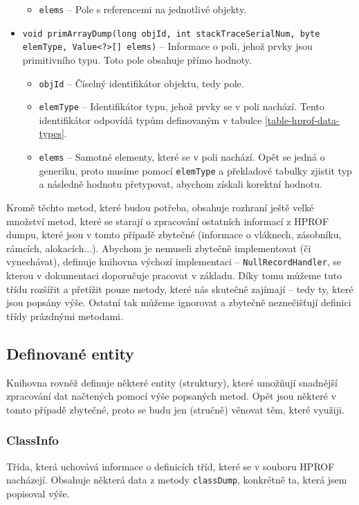 \begin{itemize}
\begin{itemize}
        \item \texttt{elems} -- Pole s referencemi na jednotlivé objekty.
    \end{itemize}
    \item \texttt{void primArrayDump(long objId, int stackTraceSerialNum, byte \\ elemType, Value<?>[] elems)} -- Informace o poli, jehož prvky jsou primitivního typu. Toto pole obsahuje přímo hodnoty.
    \begin{itemize}
        \item \texttt{objId} -- Číselný identifikátor objektu, tedy pole.
        \item \texttt{elemType} -- Identifikátor typu, jehož prvky se v poli nachází. Tento identifikátor odpovídá typům definovaným v tabulce \ref{table-hprof-data-types}.
        \item \texttt{elems} -- Samotné elementy, které se v poli nachází. Opět se jedná o generiku, proto musíme pomocí \texttt{elemType} a překladové tabulky zjistit typ a následně hodnotu přetypovat, abychom získali korektní hodnotu.
    \end{itemize}
\end{itemize}

Kromě těchto metod, které budou potřeba, obsahuje rozhraní ještě velké množství metod, které se starají o zpracování ostatních informací z HPROF dumpu, které jsou v tomto případě zbytečné (informace o vláknech, zásobníku, rámcích, alokacích...). Abychom je nemuseli zbytečně implementovat (či vynechávat), definuje knihovna výchozí implementaci -- \texttt{NullRecordHandler}, se kterou v dokumentaci doporučuje pracovat v základu. Díky tomu můžeme tuto třídu rozšířit a přetížit pouze metody, které nás skutečně zajímají -- tedy ty, které jsou popsány výše. Ostatní tak můžeme ignorovat a zbytečně neznečišťují definici třídy prázdnými metodami.

\subsection{Definované entity}
Knihovna rovněž definuje některé entity (struktury), které umožňují snadnější zpracování dat načtených pomocí výše popsaných metod. Opět jsou některé v tomto případě zbytečné, proto se budu jen (stručně) věnovat těm, které využiji.

\subsubsection{ClassInfo}
Třída, která uchovává informace o definicích tříd, které se v souboru HPROF nacházejí. Obsahuje některá data z metody \texttt{classDump}, konkrétně ta, která jsem popisoval výše.

